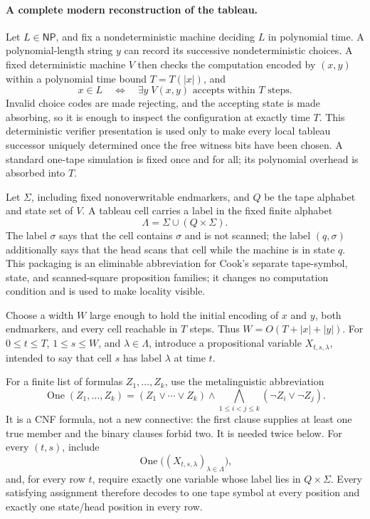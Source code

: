 \paragraph{A complete modern reconstruction of the tableau.}
Let \(L\in\mathsf{NP}\), and fix a nondeterministic machine deciding \(L\) in
polynomial time.  A polynomial-length string \(y\) can record its successive
nondeterministic choices.  A fixed deterministic machine \(V\) then checks the
computation encoded by \((x,y)\) within a polynomial time bound \(T=T(|x|)\),
and
\[
 x\in L
 \quad\Longleftrightarrow\quad
 \exists y\; V(x,y)\text{ accepts within }T\text{ steps}.
\]
Invalid choice codes are made rejecting, and the accepting state is made
absorbing, so it is enough to inspect the configuration at exactly time \(T\).
This deterministic verifier presentation is used only to make every local
tableau successor uniquely determined once the free witness bits have been
chosen.  A standard one-tape simulation is fixed once and for all; its
polynomial overhead is absorbed into \(T\).

Let \(\Sigma\), including fixed nonoverwritable endmarkers, and \(Q\) be the
tape alphabet and state set of \(V\).
A tableau cell carries a label in the fixed finite alphabet
\[
 \Lambda=\Sigma\cup(Q\times\Sigma).
\]
The label \(\sigma\) says that the cell contains \(\sigma\) and is not scanned;
the label \((q,\sigma)\) additionally says that the head scans that cell while
the machine is in state \(q\).  This packaging is an eliminable abbreviation
for Cook's separate tape-symbol, state, and scanned-square proposition
families; it changes no computation condition and is used to make locality
visible.

Choose a width \(W\) large enough to hold the initial encoding of \(x\) and
\(y\), both endmarkers, and every cell reachable in \(T\) steps.  Thus
\(W=O(T+|x|+|y|)\).  For
\(0\leq t\leq T\), \(1\leq s\leq W\), and
\(\lambda\in\Lambda\), introduce a propositional variable
\(X_{t,s,\lambda}\), intended to say that cell \(s\) has label \(\lambda\) at
time \(t\).

For a finite list of formulas \(Z_1,\ldots,Z_k\), use the metalinguistic
abbreviation
\[
 \operatorname{One}(Z_1,\ldots,Z_k)
   = (Z_1\lor\cdots\lor Z_k)
     \land
     \bigwedge_{1\leq i<j\leq k}(\neg Z_i\lor\neg Z_j).
\]
It is a CNF formula, not a new connective: the first clause supplies at least
one true member and the binary clauses forbid two.  It is needed twice below.
For every \((t,s)\), include
\[
 \operatorname{One}\bigl((X_{t,s,\lambda})_{\lambda\in\Lambda}\bigr),
\]
and, for every row \(t\), require exactly one variable whose label lies in
\(Q\times\Sigma\).  Every satisfying assignment therefore decodes to one tape
symbol at every position and exactly one state/head position in every row.

